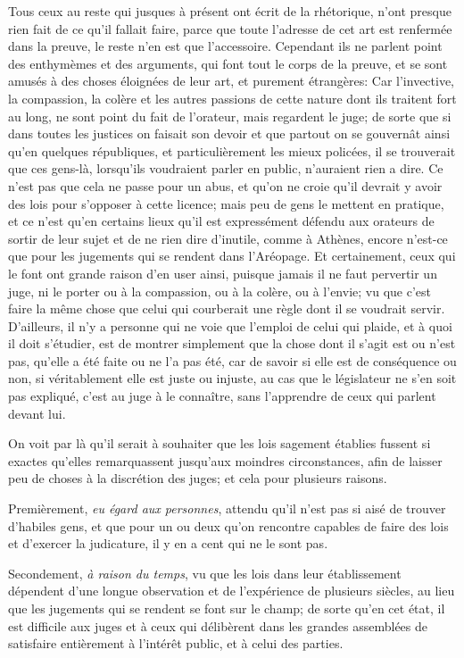Tous ceux au reste qui jusques à présent ont écrit de la rhétorique, n'ont presque rien fait de ce qu'il fallait faire, parce que
toute l'adresse de cet art est renfermée dans la preuve, le reste n'en est que l'accessoire. Cependant ils ne  parlent point des
enthymèmes et des arguments, qui font tout le corps de la preuve, et se sont amusés à des choses éloignées de leur art, et purement
étrangères: Car l'invective, la compassion, la colère et les autres passions de cette nature dont ils traitent fort au long, ne
sont point du fait de l'orateur, mais regardent le juge; de sorte que si dans toutes les justices on faisait son devoir et que
partout on se gouvernât ainsi qu'en quelques républiques, et particulièrement les mieux policées, il se trouverait que ces gens-là,
lorsqu'ils voudraient parler en public, n'auraient rien a dire. Ce n'est pas que cela ne passe pour un abus, et qu'on ne croie
qu'il devrait y avoir des lois pour s'opposer à cette licence; mais peu de gens le mettent en pratique, et ce n'est qu'en certains
lieux qu'il est expressément défendu aux orateurs de sortir de leur sujet et de ne rien dire d'inutile, comme à Athènes, encore
n'est-ce que pour les jugements qui se rendent dans l'Aréopage. Et certainement, ceux qui le font ont grande raison d'en user ainsi,
puisque jamais il ne faut pervertir un juge, ni le porter ou à la compassion, ou à la colère, ou à l'envie; vu que c'est faire la même
chose que  celui qui courberait une règle dont il se voudrait servir. D'ailleurs, il n'y a personne qui ne voie que l'emploi de celui
qui plaide, et à quoi il doit s'étudier, est de montrer simplement que la chose dont il s'agit est ou n'est pas, qu'elle a été faite ou
ne l'a pas été, car de savoir si elle  est de conséquence ou non, si véritablement elle est juste ou injuste, au cas que le législateur
ne s'en soit pas expliqué, c'est au juge à le connaître, sans l'apprendre de ceux qui parlent devant lui. 

\bigbreak

On voit par là qu'il serait à souhaiter que les lois sagement établies fussent si exactes qu'elles remarquassent jusqu'aux moindres
circonstances, afin de laisser peu de choses à la discrétion des juges; et cela pour plusieurs raisons.

Premièrement, \emph{eu égard aux personnes}, attendu qu'il n'est pas si aisé de trouver d'habiles gens, et que pour un ou deux qu'on
rencontre capables de faire des lois et d'exercer la judicature, il y  en a cent qui ne le sont pas.

Secondement, \emph{à raison du temps}, vu que les lois dans leur établissement dépendent d'une longue observation et de l'expérience de
plusieurs siècles, au lieu que les jugements qui se rendent se font sur le champ; de sorte qu'en cet état, il est difficile aux juges et
à ceux qui délibèrent dans les grandes assemblées de satisfaire  entièrement à l'intérêt public, et à celui des parties.

